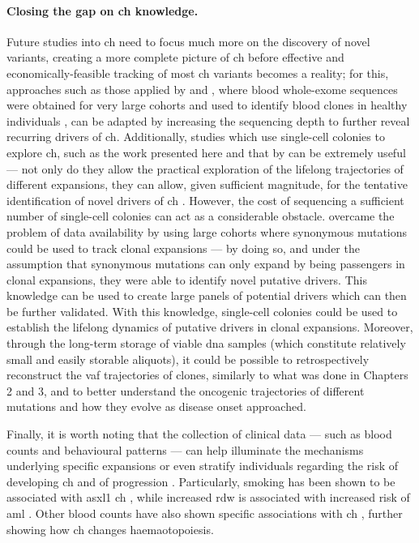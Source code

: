 \paragraph{Closing the gap on \ac{ch} knowledge.} Future studies into \ac{ch} need to focus much more on the discovery of novel variants, creating a more complete picture of \ac{ch} before effective and economically-feasible tracking of most \ac{ch} variants becomes a reality; for this, approaches such as those applied by  and , where blood whole-exome sequences were obtained for very large cohorts and used to identify blood clones in healthy individuals \cite{Jaiswal2014-rl,Genovese2014-eu}, can be adapted by increasing the sequencing depth to further reveal recurring drivers of \ac{ch}. Additionally, studies which use single-cell colonies to explore \ac{ch}, such as the work presented here and that by  can be extremely useful --- not only do they allow the practical exploration of the lifelong trajectories of different expansions, they can allow, given sufficient magnitude, for the tentative identification of novel drivers of \ac{ch} \cite{Fabre2021-uw,Mitchell2021-zl}. However, the cost of sequencing a sufficient number of single-cell colonies can act as a considerable obstacle.  overcame the problem of data availability by using large cohorts where synonymous mutations could be used to track clonal expansions --- by doing so, and under the assumption that synonymous mutations can only expand by being passengers in clonal expansions, they were able to identify novel putative drivers. This knowledge can be used to create large panels of potential drivers which can then be further validated. With this knowledge, single-cell colonies could be used to establish the lifelong dynamics of putative drivers in clonal expansions. Moreover, through the long-term storage of viable \ac{dna} samples (which constitute relatively small and easily storable aliquots), it could be possible to retrospectively reconstruct the \ac{vaf} trajectories of clones, similarly to what was done in Chapters 2 and 3, and to better understand the oncogenic trajectories of different mutations and how they evolve as disease onset approached. 

Finally, it is worth noting that the collection of clinical data --- such as blood counts and behavioural patterns --- can help illuminate the mechanisms underlying specific expansions or even stratify individuals regarding the risk of developing \ac{ch} and of progression \cite{Dawoud2020-af,Abelson2018-wh}. Particularly, smoking has been shown to be associated with \ac{asxl1} \ac{ch} \cite{Dawoud2020-af}, while increased \ac{rdw} is associated with increased risk of \ac{aml} \cite{Abelson2018-wh}. Other blood counts have also shown specific associations with \ac{ch} \cite{Bick2019-uj,Dawoud2020-af,Cordua2019-mo,Abelson2018-wh,Zink2017-zi,Jaiswal2014-rl,Zehir2017-gh}, further showing how \ac{ch} changes haemaotopoiesis.


